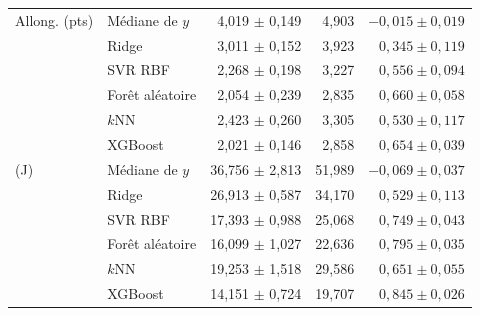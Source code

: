\begin{table}[htbp]
\begin{tabular}{@{}l l r r r@{}}
\midrule
Allong. (pts) & Médiane de $y$ & 4,019 $\pm$ 0,149 & 4,903 & $-0{,}015 \pm 0{,}019$ \\
              & Ridge          & 3,011 $\pm$ 0,152 & 3,923 & $0{,}345 \pm 0{,}119$ \\
              & SVR RBF        & 2,268 $\pm$ 0,198 & 3,227 & $0{,}556 \pm 0{,}094$ \\
              & Forêt aléatoire & 2,054 $\pm$ 0,239 & 2,835 & $0{,}660 \pm 0{,}058$ \\
              & $k$NN          & 2,423 $\pm$ 0,260 & 3,305 & $0{,}530 \pm 0{,}117$ \\
              & XGBoost        & 2,021 $\pm$ 0,146 & 2,858 & $0{,}654 \pm 0{,}039$ \\
\midrule
\charpy{} (J) & Médiane de $y$ & 36,756 $\pm$ 2,813 & 51,989 & $-0{,}069 \pm 0{,}037$ \\
              & Ridge          & 26,913 $\pm$ 0,587 & 34,170 & $0{,}529 \pm 0{,}113$ \\
              & SVR RBF        & 17,393 $\pm$ 0,988 & 25,068 & $0{,}749 \pm 0{,}043$ \\
              & Forêt aléatoire & 16,099 $\pm$ 1,027 & 22,636 & $0{,}795 \pm 0{,}035$ \\
              & $k$NN          & 19,253 $\pm$ 1,518 & 29,586 & $0{,}651 \pm 0{,}055$ \\
              & XGBoost        & 14,151 $\pm$ 0,724 & 19,707 & $0{,}845 \pm 0{,}026$ \\
\bottomrule
\end{tabular}
\end{table}

